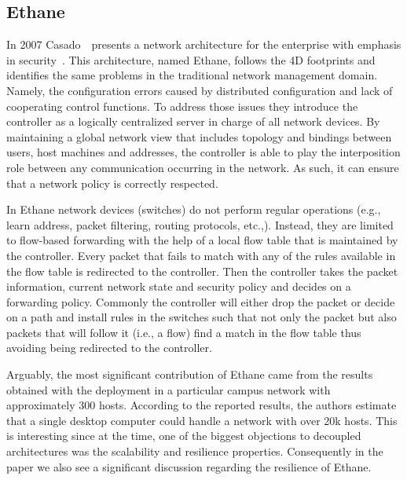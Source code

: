 \subsection{Ethane}
In 2007  Casado~\etal\ presents a network architecture for the enterprise with emphasis in security~\cite{Casado:2007kb}. 
This architecture, named Ethane, follows the 4D footprints and identifies the same problems in the traditional network management domain. Namely, the configuration errors caused by distributed configuration and lack of cooperating control functions. 
To address those issues they introduce the controller as a logically centralized server in charge of all network devices.
By maintaining a global network view that includes topology and  bindings between users, host machines and addresses, the controller is able to play the interposition role between any communication occurring in the network. As such, it can ensure that a network policy is correctly respected. 


In Ethane network devices (switches) do not perform regular operations (e.g., learn address, packet filtering, routing protocols, etc.,).
Instead, they are limited  to flow-based forwarding with the help of a local flow table that is maintained by the controller.
Every packet that fails to match with any of the rules available in the flow table is redirected to the controller. Then the controller takes the packet information, current network state and security policy and decides on a forwarding policy. Commonly the controller will either drop the packet or decide on a path and install rules in the switches such that  not only the packet but also packets that will follow it (i.e., a flow) find a match in the flow table thus avoiding being redirected to the controller. 


Arguably, the most significant contribution of Ethane came from the results obtained with the deployment in a particular campus network with approximately 300 hosts. 
According to the reported results, the authors estimate that a single desktop computer could handle a network with over 20k hosts.  
This is interesting since at the time,  one of the biggest objections to decoupled architectures was the scalability and resilience properties. 
Consequently  in the paper we also see a significant discussion regarding the resilience of Ethane. 


